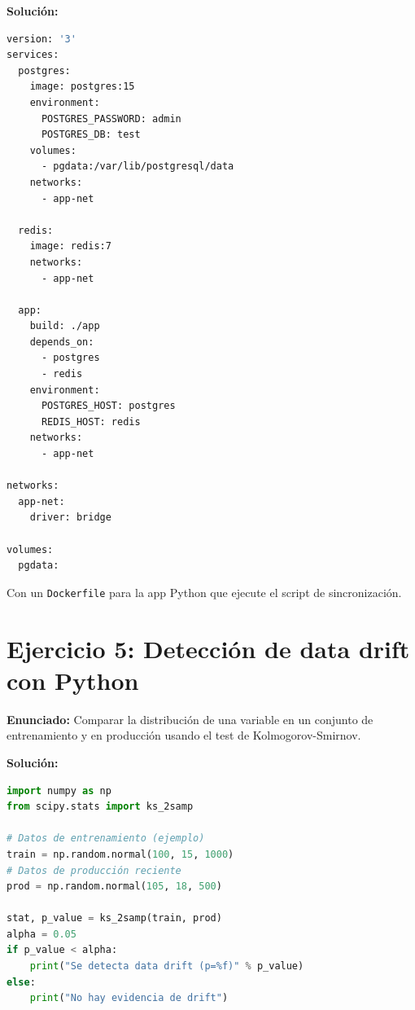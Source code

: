 \documentclass[12pt,a4paper,openany,oneside]{book}
\begin{document}
\textbf{Solución:}
\begin{lstlisting}[language=Bash, basicstyle=\ttfamily\small]
version: '3'
services:
  postgres:
    image: postgres:15
    environment:
      POSTGRES_PASSWORD: admin
      POSTGRES_DB: test
    volumes:
      - pgdata:/var/lib/postgresql/data
    networks:
      - app-net

  redis:
    image: redis:7
    networks:
      - app-net

  app:
    build: ./app
    depends_on:
      - postgres
      - redis
    environment:
      POSTGRES_HOST: postgres
      REDIS_HOST: redis
    networks:
      - app-net

networks:
  app-net:
    driver: bridge

volumes:
  pgdata:
\end{lstlisting}
Con un \texttt{Dockerfile} para la app Python que ejecute el script de sincronización.

\section{Ejercicio 5: Detección de data drift con Python}
\textbf{Enunciado:} Comparar la distribución de una variable en un conjunto de entrenamiento y en producción usando el test de Kolmogorov-Smirnov.

\textbf{Solución:}
\begin{lstlisting}[language=Python]
import numpy as np
from scipy.stats import ks_2samp

# Datos de entrenamiento (ejemplo)
train = np.random.normal(100, 15, 1000)
# Datos de producción reciente
prod = np.random.normal(105, 18, 500)

stat, p_value = ks_2samp(train, prod)
alpha = 0.05
if p_value < alpha:
    print("Se detecta data drift (p=%f)" % p_value)
else:
    print("No hay evidencia de drift")
\end{lstlisting}
\end{document}
